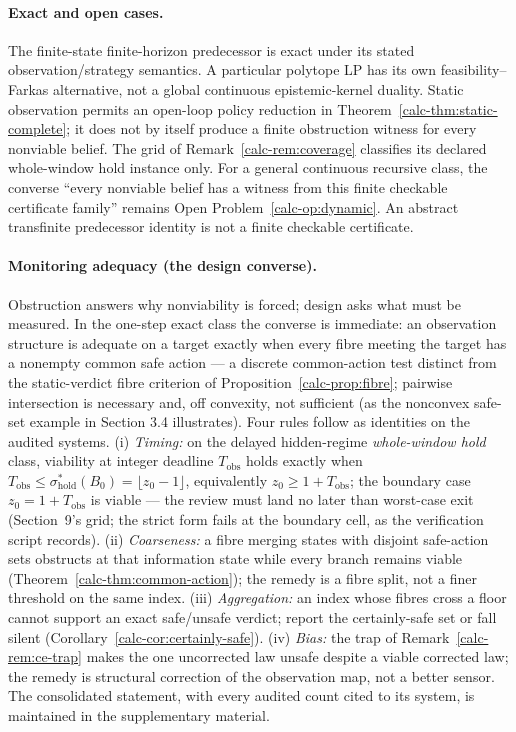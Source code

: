 \documentclass[10pt,twocolumn]{article}
\theoremstyle{definition}
\begin{document}
\paragraph{Exact and open cases.} The finite-state finite-horizon predecessor is exact under its stated observation/strategy semantics. A particular polytope LP has its own feasibility--Farkas alternative, not a global continuous epistemic-kernel duality. Static observation permits an open-loop policy reduction in Theorem~\ref{calc-thm:static-complete}; it does not by itself produce a finite obstruction witness for every nonviable belief. The grid of Remark~\ref{calc-rem:coverage} classifies its declared whole-window hold instance only. For a general continuous recursive class, the converse ``every nonviable belief has a witness from this finite checkable certificate family'' remains Open Problem~\ref{calc-op:dynamic}. An abstract transfinite predecessor identity is not a finite checkable certificate.

\paragraph{Monitoring adequacy (the design converse).} Obstruction answers why nonviability is forced; design asks what must be measured. In the one-step exact class the converse is immediate: an observation structure is adequate on a target exactly when every fibre meeting the target has a nonempty common safe action --- a discrete common-action test distinct from the static-verdict fibre criterion of Proposition~\ref{calc-prop:fibre}; pairwise intersection is necessary and, off convexity, not sufficient (as the nonconvex safe-set example in Section 3.4 illustrates). Four rules follow as identities on the audited systems. (i) \emph{Timing:} on the delayed hidden-regime \emph{whole-window hold} class, viability at integer deadline \(T_{\mathrm{obs}}\) holds exactly when \(T_{\mathrm{obs}} \le \sigma^{*}_{\mathrm{hold}}(B_{0}) = \lfloor z_{0} - 1\rfloor\), equivalently \(z_{0} \ge 1 + T_{\mathrm{obs}}\); the boundary case \(z_{0} = 1 + T_{\mathrm{obs}}\) is viable --- the review must land no later than worst-case exit (Section~9's grid; the strict form fails at the boundary cell, as the verification script records). (ii) \emph{Coarseness:} a fibre merging states with disjoint safe-action sets obstructs at that information state while every branch remains viable (Theorem~\ref{calc-thm:common-action}); the remedy is a fibre split, not a finer threshold on the same index. (iii) \emph{Aggregation:} an index whose fibres cross a floor cannot support an exact safe/unsafe verdict; report the certainly-safe set or fall silent (Corollary~\ref{calc-cor:certainly-safe}). (iv) \emph{Bias:} the trap of Remark~\ref{calc-rem:ce-trap} makes the one uncorrected law unsafe despite a viable corrected law; the remedy is structural correction of the observation map, not a better sensor. The consolidated statement, with every audited count cited to its system, is maintained in the supplementary material.
\end{document}
